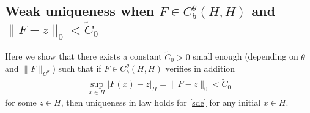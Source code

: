 \documentclass[preprint]{imsart}
\begin{document}
 
  


\subsection{ Weak uniqueness  
 when $F \in C_b^{\theta} (H,H)$ and  $\| F- z \|_{0} < {\tilde C_0} $    }

 Here  we show that there exists a constant ${\tilde C_0}>0$ small enough (depending on $\theta$ and $\|F \|_{C^{\theta}}$) such that if  $F \in C^{\theta}_b(H,H)$ verifies in addition
  \begin{gather} \label{111}
\sup_{x \in H} | F(x)- z |_H =  \| F- z \|_0 < {\tilde C_0}
\end{gather}
 for some $z \in H$,   then uniqueness in law holds for \eqref{sde} for any initial $x \in H$.
 
\end{document}
